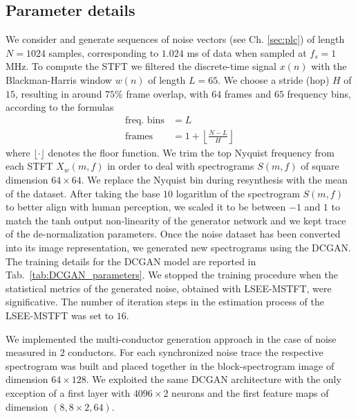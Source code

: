 \subsection{Parameter details}
We consider and generate sequences of noise vectors (see Ch. \ref{sec:plc}) of length $N=1024$ samples, corresponding to $1.024$ ms of data when sampled at $f_s=1$ MHz. 
To compute the STFT we filtered the discrete-time signal $x(n)$ with the Blackman-Harris window $w(n)$ of length $L=65$. We choose a stride (hop) $H$ of $15$, resulting in around $75\%$ frame overlap, with $64$ frames and $65$ frequency bins, according to the formulas
\begin{align*}
\text{freq. bins} &= L \nonumber \\
\text{frames} &= 1+\left\lfloor\frac{N-L}{H}\right \rfloor 
\end{align*}
where $\lfloor \cdot \rfloor$ denotes the floor function. We trim the top Nyquist frequency from each STFT $X_w(m,f)$ in order to deal with spectrograms $S(m,f)$ of square dimension $64\times 64$. We replace the Nyquist bin during resynthesis with the mean of the dataset.
After taking the base $10$ logarithm of the spectrogram $S(m,f)$ to better align with human perception, we scaled it to be between $-1$ and $1$ to match the $\text{tanh}$ output non-linearity of the generator network and we kept trace of the de-normalization parameters.
Once the noise dataset has been converted into its image representation, we generated new spectrograms using the DCGAN. The training details for the DCGAN model are reported in Tab.~\ref{tab:DCGAN_parameters}. 
We stopped the training procedure when the statistical metrics of the generated noise, obtained with LSEE-MSTFT, were significative. The number of iteration steps in the estimation process of the LSEE-MSTFT was set to $16$.

We implemented the multi-conductor generation approach in the case of noise measured in $2$ conductors. For each synchronized noise trace the respective spectrogram was built and placed together in the block-spectrogram image of dimension $64\times 128$. We exploited the same DCGAN architecture with the only exception of a first layer with $4096\times 2$ neurons and the first feature maps of dimension $(8,8\times 2,64)$.


